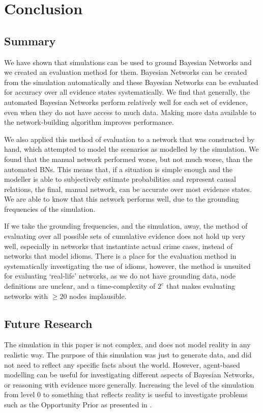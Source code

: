 \documentclass[12pt]{article}
\begin{document}
\section{Conclusion}

\subsection{Summary}
We have shown that simulations can be used to ground Bayesian Networks and we created an evaluation method for them. Bayesian Networks can be created from the simulation automatically and these Bayesian Networks can be evaluated for accuracy over all evidence states systematically. We find that generally, the automated Bayesian Networks perform relatively well for each set of evidence, even when they do not have access to much data. Making more data available to the network-building algorithm improves performance. 

We also applied this method of evaluation to a network that was constructed by hand, which attempted to model the scenarios as modelled by the simulation. We found that the manual network performed worse, but not much worse, than the automated BNs. This means that, if a situation is simple enough and the modeller is able to subjectively estimate probabilities and represent causal relations, the final, manual network, can be accurate over most evidence states. We are able to know that this network performs well, due to the grounding frequencies of the simulation.

If we take the grounding frequencies, and the simulation, away, the method of evaluating over all possible sets of cumulative evidence does not hold up very well, especially in networks that instantiate actual crime cases, instead of networks that model idioms. There is a place for the evaluation method in systematically investigating the use of idioms, however, the method is unsuited for evaluating `real-life' networks, as we do not have grounding data, node definitions are unclear, and a time-complexity of $2^e$ that makes evaluating networks with $\geq 20$ nodes implausible.

 
\subsection{Future Research}

The simulation in this paper is not complex, and does not model reality in any realistic way. The purpose of this simulation was just to generate data, and did not need to reflect any specific facts about the world. However, agent-based modelling can be useful for investigating different aspects of Bayesian Networks, or reasoning with evidence more generally. Increasing the level of the simulation from level 0 to something that reflects reality is useful to investigate problems such as the Opportunity Prior as presented in \citet{Fenton2017}. 
\end{document}

